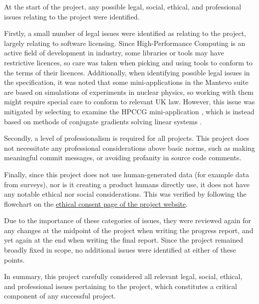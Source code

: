 At the start of the project, any possible legal, social, ethical, and professional issues relating to the project were identified. 

Firstly, a small number of legal issues were identified as relating to the project, largely relating to software licensing. Since High-Performance Computing is an active field of development in industry, some libraries or tools may have restrictive licences, so care was taken when picking and using tools to conform to the terms of their licences. Additionally, when identifying possible legal issues in the specification, it was noted that some mini-applications in the Mantevo suite are based on simulations of experiments in nuclear physics, so working with them might require special care to conform to relevant UK law. However, this issue was mitigated by selecting to examine the HPCCG mini-application \cite{herouxHPCCGSolverPackage2007}, which is instead based on methods of conjugate gradients solving linear systems \cite{hestenesMethodsConjugateGradients1952}.

Secondly, a level of professionalism is required for all projects. This project does not necessitate any professional considerations above basic norms, such as making meaningful commit messages, or avoiding profanity in source code comments. %

Finally, since this project does not use human-generated data (for example data from surveys), nor is it creating a product humans directly use, it does not have any notable ethical nor social considerations. This was verified by following the flowchart on the \href{https://warwick.ac.uk/fac/sci/dcs/teaching/ethics}{ethical consent page of the project website}. %

Due to the importance of these categories of issues, they were reviewed again for any changes at the midpoint of the project when writing the progress report, and yet again at the end when writing the final report. Since the project remained broadly fixed in scope, no additional issues were identified at either of these points.

In summary, this project carefully considered all relevant legal, social, ethical, and professional issues pertaining to the project, which constitutes a critical component of any successful project.

